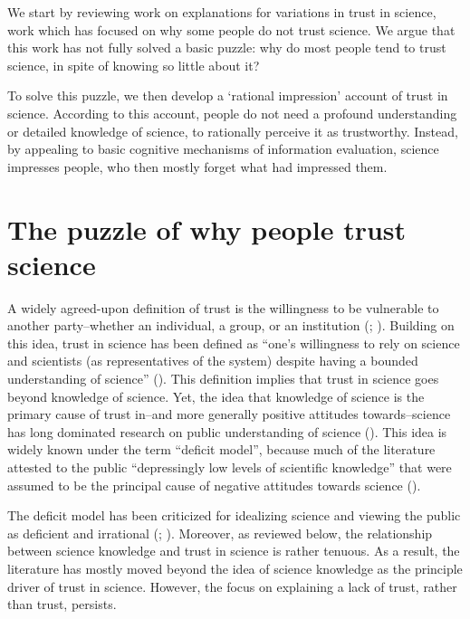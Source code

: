 \documentclass[
  jou,
  floatsintext,
  longtable,
  nolmodern,
  notxfonts,
  notimes,
  colorlinks=true,linkcolor=blue,citecolor=blue,urlcolor=blue]{apa7}
\begin{document}
We start by reviewing work on explanations for variations in trust in
science, work which has focused on why some people do not trust science.
We argue that this work has not fully solved a basic puzzle: why do most
people tend to trust science, in spite of knowing so little about it?

To solve this puzzle, we then develop a `rational impression' account of
trust in science. According to this account, people do not need a
profound understanding or detailed knowledge of science, to rationally
perceive it as trustworthy. Instead, by appealing to basic cognitive
mechanisms of information evaluation, science impresses people, who then
mostly forget what had impressed them.

\section{The puzzle of why people trust
science}\label{the-puzzle-of-why-people-trust-science}

A widely agreed-upon definition of trust is the willingness to be
vulnerable to another party--whether an individual, a group, or an
institution
(; ). Building on this idea, trust in science has been defined as
``one's willingness to rely on science and scientists (as
representatives of the system) despite having a bounded understanding of
science'' (). This definition implies that trust in science goes
beyond knowledge of science. Yet, the idea that knowledge of science is
the primary cause of trust in--and more generally positive attitudes
towards--science has long dominated research on public understanding of
science (). This
idea is widely known under the term ``deficit model'', because much of
the literature attested to the public ``depressingly low levels of
scientific knowledge'' that were assumed to be the principal cause of
negative attitudes towards science
().

The deficit model has been criticized for idealizing science and viewing
the public as deficient and irrational
(;
).
Moreover, as reviewed below, the relationship between science knowledge
and trust in science is rather tenuous. As a result, the literature has
mostly moved beyond the idea of science knowledge as the principle
driver of trust in science. However, the focus on explaining a lack of
trust, rather than trust, persists.
\end{document}
